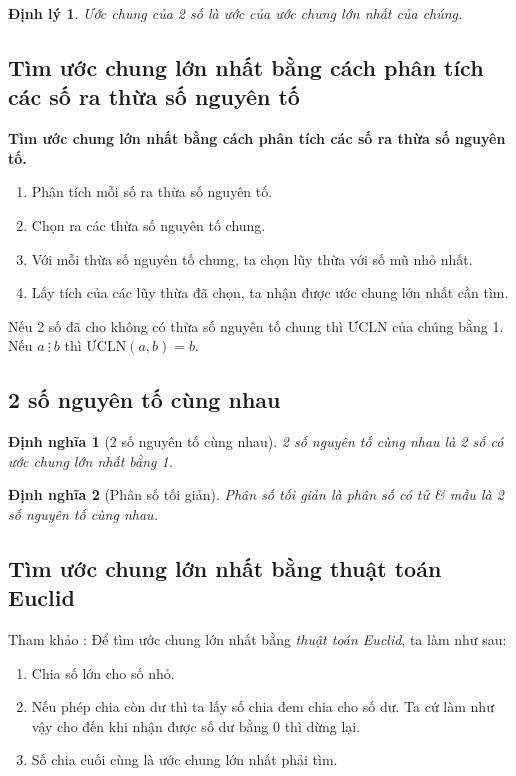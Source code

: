 \documentclass[oneside]{book}
\numberwithin{equation}{section}
\newtheorem{dinhnghia}{Định nghĩa}[section]
\newtheorem{dinhly}{Định lý}[section]
\begin{document}
\begin{dinhly}
	Ước chung của 2 số là ước của ước chung lớn nhất của chúng.
\end{dinhly}

\subsection{Tìm ước chung lớn nhất bằng cách phân tích các số ra thừa số nguyên tố}
\begin{tcolorbox}
	\textbf{Tìm ước chung lớn nhất bằng cách phân  tích các số ra thừa số nguyên tố.}
	\begin{enumerate}
		\item Phân tích mỗi số ra thừa số nguyên tố.
		\item Chọn ra các thừa số nguyên tố chung.
		\item Với mỗi thừa số nguyên tố chung, ta chọn lũy thừa với số mũ nhỏ nhất.
		\item Lấy tích của các lũy thừa đã chọn, ta nhận được ước chung lớn nhất cần tìm.
	\end{enumerate}
\end{tcolorbox}
Nếu 2 số đã cho không có thừa số nguyên tố chung thì ƯCLN của chúng bằng 1. Nếu $a\ \vdots\ b$ thì $\mbox{ƯCLN}(a,b) = b$.

\subsection{2 số nguyên tố cùng nhau}

\begin{dinhnghia}[2 số nguyên tố cùng nhau]
	\emph{2 số nguyên tố cùng nhau} là 2 số có ước chung lớn nhất bằng 1.
\end{dinhnghia}

\begin{dinhnghia}[Phân số tối giản]
	\emph{Phân số tối giản} là phân số có tử \textit{\&} mẫu là 2 số nguyên tố cùng nhau.
\end{dinhnghia}

\subsection{Tìm ước chung lớn nhất bằng thuật toán Euclid}
Tham khảo \cite[p. 52]{Thai_Anh_Dat_Ha_Loan_Nam_Quang_Toan_6_tap_1}: Để tìm ước chung lớn nhất bằng \textit{thuật toán Euclid}, ta làm như sau:
\begin{enumerate}
	\item Chia số lớn cho số nhỏ.
	\item Nếu phép chia còn dư thì ta lấy số chia đem chia cho số dư. Ta cứ làm như vậy cho đến khi nhận được số dư bằng 0 thì dừng lại.
	\item Số chia cuối cùng là ước chung lớn nhất phải tìm.
\end{enumerate}
\end{document}
